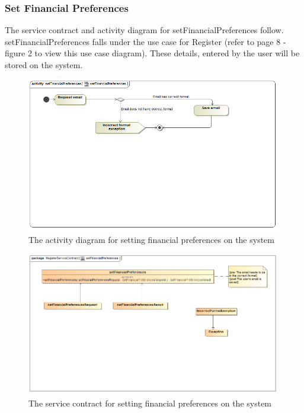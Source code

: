 \documentclass[a4paper,12pt]{article}
\begin{document}
\subsubsection{Set Financial Preferences }
The service contract and activity diagram for setFinancialPreferences follow. setFinancialPreferences falls under the use case for Register (refer to page 8 - figure 2 to view this use case diagram). These details, entered by the user will be stored on the system.
\begin{figure}[H]
  \centering
    \includegraphics[width=1.0\textwidth]{../diagrams/Register/ActivityDiagrams/setFinancialPreferences1.png}
    \caption{The activity diagram for setting financial preferences on the system} 
\end{figure}
\begin{figure}[H]
  \centering
    \includegraphics[width=1.0\textwidth]{../diagrams/Register/ServiceContractsRegister/setFinancialPreferencesServiceContract.png}
    \caption{The service contract for setting financial preferences on the system} 
\end{figure}
\end{document}
